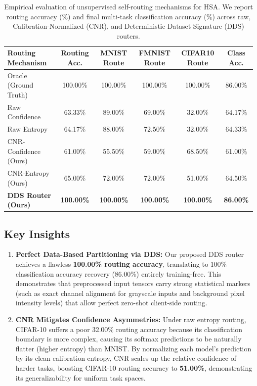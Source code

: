 \documentclass{article}
\theoremstyle{plain}
\theoremstyle{definition}
\theoremstyle{remark}
\begin{document}
\begin{table}[H]
\centering
\caption{Empirical evaluation of unsupervised self-routing mechanisms for HSA. We report routing accuracy (\%) and final multi-task classification accuracy (\%) across raw, Calibration-Normalized (CNR), and Deterministic Dataset Signature (DDS) routers.}
\label{tab:self_routing}
\vskip 0.1in
\begin{tabular}{lccccc}
\toprule
Routing Mechanism & Routing Acc. & MNIST Route & FMNIST Route & CIFAR10 Route & Class Acc. \\
\midrule
Oracle (Ground Truth) & 100.00\% & 100.00\% & 100.00\% & 100.00\% & 86.00\% \\
\midrule
Raw Confidence & 63.33\% & 89.00\% & 69.00\% & 32.00\% & 64.17\% \\
Raw Entropy & 64.17\% & 88.00\% & 72.50\% & 32.00\% & 64.33\% \\
\midrule
CNR-Confidence (Ours) & 61.00\% & 55.50\% & 59.00\% & 68.50\% & 61.00\% \\
CNR-Entropy (Ours) & 65.00\% & 72.00\% & 72.00\% & 51.00\% & 64.50\% \\
\textbf{DDS Router (Ours)} & \textbf{100.00\%} & \textbf{100.00\%} & \textbf{100.00\%} & \textbf{100.00\%} & \textbf{86.00\%} \\
\bottomrule
\end{tabular}
\end{table}

\subsection{Key Insights}
\begin{enumerate}
    \item \textbf{Perfect Data-Based Partitioning via DDS:} Our proposed DDS router achieves a flawless \textbf{100.00\% routing accuracy}, translating to 100\% classification accuracy recovery (86.00\%) entirely training-free. This demonstrates that preprocessed input tensors carry strong statistical markers (such as exact channel alignment for grayscale inputs and background pixel intensity levels) that allow perfect zero-shot client-side routing.
    \item \textbf{CNR Mitigates Confidence Asymmetries:} Under raw entropy routing, CIFAR-10 suffers a poor 32.00\% routing accuracy because its classification boundary is more complex, causing its softmax predictions to be naturally flatter (higher entropy) than MNIST. By normalizing each model's prediction by its clean calibration entropy, CNR scales up the relative confidence of harder tasks, boosting CIFAR-10 routing accuracy to \textbf{51.00\%}, demonstrating its generalizability for uniform task spaces.
\end{enumerate}
\end{document}
